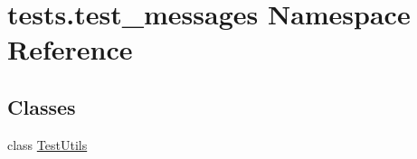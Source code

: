 \hypertarget{namespacetests_1_1test__messages}{}\section{tests.\+test\+\_\+messages Namespace Reference}
\label{namespacetests_1_1test__messages}
\subsection*{Classes}
\begin{DoxyCompactItemize}
\item 
class \hyperlink{classtests_1_1test__messages_1_1TestUtils}{Test\+Utils}
\end{DoxyCompactItemize}
